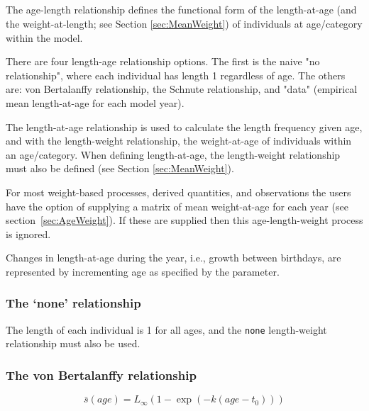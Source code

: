 
\subsection{\label{sec:AgeLength}}

The age-length relationship defines the functional form of the length-at-age (and the weight-at-length; see Section \ref{sec:MeanWeight}) of individuals at age/category within the model.

There are four length-age relationship options. The first is the naive "no relationship", where each individual has length 1 regardless of age. The others are:  von Bertalanffy relationship, the Schnute relationship, and "data" (empirical mean length-at-age for each model year).

The length-at-age relationship is used to calculate the length frequency given age, and with the length-weight relationship, the weight-at-age of individuals within an age/category. When defining length-at-age, the length-weight relationship must also be defined (see Section \ref{sec:MeanWeight}).

For most weight-based processes, derived quantities, and observations the users have the option of supplying a matrix of mean weight-at-age for each year (see section~\ref{sec:AgeWeight}). If these are supplied then this age-length-weight process is ignored.

Changes in length-at-age during the year, i.e., growth between birthdays, are represented by incrementing age as specified by the  parameter.
	
\subsubsection{The `none' relationship}\label{sec:AgeLength-None}

The length of each individual is 1 for all ages, and the \texttt{none} length-weight relationship must also be used.

\subsubsection{The von Bertalanffy relationship}\label{sec:AgeLength-VonBertalanffy}

\begin{equation}
\bar{s}(age)= L_\infty \left( 1 - \exp \left( -k \left(age-t_0 \right) \right) \right)
\end{equation}

